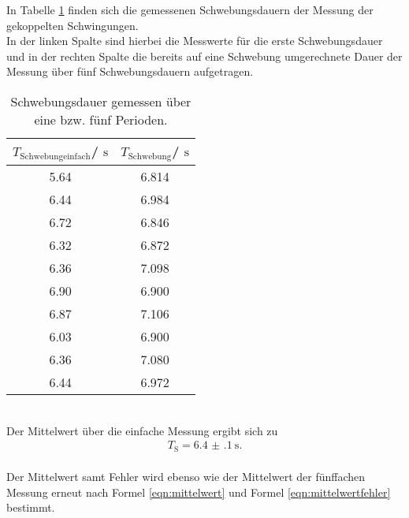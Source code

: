 In Tabelle \ref{tab:schwebung} finden sich die gemessenen Schwebungsdauern der Messung der gekoppelten Schwingungen.\\
In der linken Spalte sind hierbei die Messwerte für die erste Schwebungsdauer und in der rechten Spalte die bereits auf eine Schwebung umgerechnete Dauer der Messung über fünf Schwebungsdauern aufgetragen.
\begin{table}
	\centering
	\caption{Schwebungsdauer gemessen über eine bzw. fünf Perioden.}
	\label{tab:schwebung}
	\begin{tabular}{cc}
		\toprule
		$T_{\mathrm{Schwebung einfach}}$/ $\si{\second}$ & $T_{\mathrm{Schwebung}}$/ $\si{\second}$ \\
		\midrule
		5.64                                             & 6.814                                    \\
		6.44                                             & 6.984                                    \\
		6.72                                             & 6.846                                    \\
		6.32                                             & 6.872                                    \\
		6.36                                             & 7.098                                    \\
		6.90                                             & 6.900                                    \\
		6.87                                             & 7.106                                    \\
		6.03                                             & 6.900                                    \\
		6.36                                             & 7.080                                    \\
		6.44                                             & 6.972                                    \\
		\bottomrule
	\end{tabular}
\end{table}
\\Der Mittelwert über die einfache Messung ergibt sich zu
\begin{align*}
	T_{\mathrm{S}}=\SI{6.4(1)}{\second} \text{.}
\end{align*}
\\Der Mittelwert samt Fehler wird ebenso wie der Mittelwert der fünffachen Messung erneut nach Formel \eqref{eqn:mittelwert} und Formel \eqref{eqn:mittelwertfehler} bestimmt.
